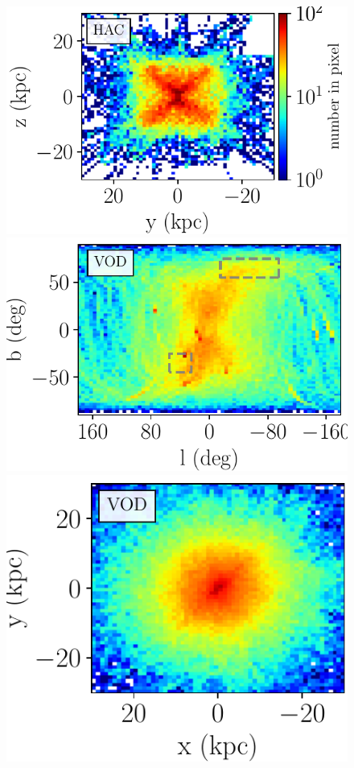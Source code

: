 \documentclass[fleqn,usenatbib]{mnras}
\begin{document}
\begin{figure}
             \includegraphics[scale=0.302]{HAC_orbits_8Gyrs_yz_defaultmass.pdf}
             \\ \includegraphics[scale=0.302]{VOD_orbits_8Gyrs_lb_defaultmass.pdf}
             \includegraphics[scale=0.302]{VOD_orbits_8Gyrs_xy_defaultmass.pdf}

\end{figure}
\end{document}

